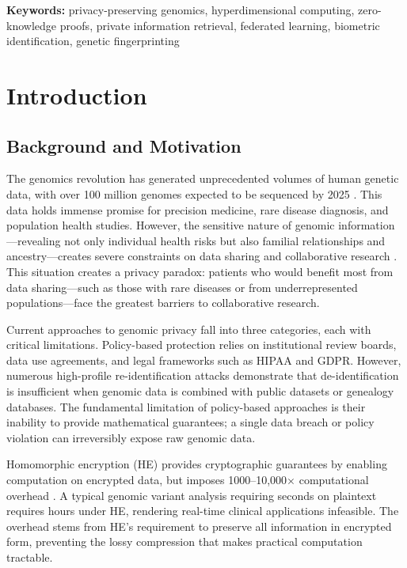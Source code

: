 \documentclass[11pt,letterpaper]{article}
\begin{document}
\noindent\textbf{Keywords:} privacy-preserving genomics, hyperdimensional computing, zero-knowledge proofs, private information retrieval, federated learning, biometric identification, genetic fingerprinting

\section{Introduction}

\subsection{Background and Motivation}

The genomics revolution has generated unprecedented volumes of human genetic data, with over 100 million genomes expected to be sequenced by 2025 \cite{birney2021}. This data holds immense promise for precision medicine, rare disease diagnosis, and population health studies. However, the sensitive nature of genomic information---revealing not only individual health risks but also familial relationships and ancestry---creates severe constraints on data sharing and collaborative research \cite{gymrek2013,erlich2014}. This situation creates a privacy paradox: patients who would benefit most from data sharing---such as those with rare diseases or from underrepresented populations---face the greatest barriers to collaborative research.

Current approaches to genomic privacy fall into three categories, each with critical limitations. Policy-based protection relies on institutional review boards, data use agreements, and legal frameworks such as HIPAA and GDPR. However, numerous high-profile re-identification attacks \cite{homer2008,im2012} demonstrate that de-identification is insufficient when genomic data is combined with public datasets or genealogy databases. The fundamental limitation of policy-based approaches is their inability to provide mathematical guarantees; a single data breach or policy violation can irreversibly expose raw genomic data.

Homomorphic encryption (HE) provides cryptographic guarantees by enabling computation on encrypted data, but imposes 1000--10,000$\times$ computational overhead \cite{kim2015,chen2016}. A typical genomic variant analysis requiring seconds on plaintext requires hours under HE, rendering real-time clinical applications infeasible. The overhead stems from HE's requirement to preserve all information in encrypted form, preventing the lossy compression that makes practical computation tractable.
\end{document}
